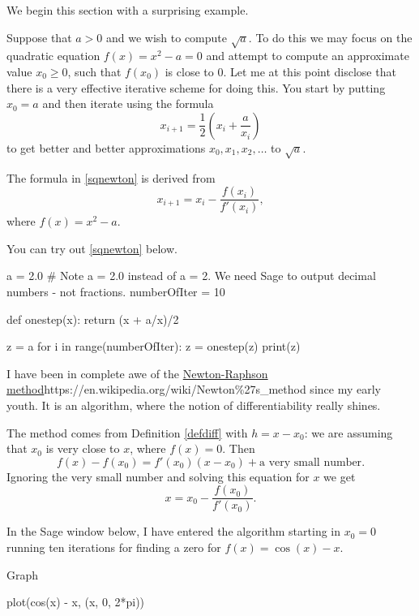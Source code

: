 \documentclass{article}
\begin{document}
We begin this section with a surprising example.



\begin{example}
Suppose that $a> 0$ and we wish to compute $\sqrt{a}$. To do this we may focus on the
quadratic equation $f(x) = x^2 - a = 0$ and attempt to compute an approximate value $x_0\geq 0$,
such that $f(x_0)$ is close to $0$. Let me at this point disclose that there is
a very effective iterative scheme for doing this. You start by putting $x_0 = a$ and then iterate
using the formula
\begin{equation}\label{sqnewton}
x_{i+1} = \frac{1}{2}\left(x_i + \frac{a}{x_i}\right)
\end{equation}
to get better and better approximations $x_0, x_1, x_2, \dots$ to $\sqrt{a}$. 

\begin{openeyes}
The formula in \eqref{sqnewton} is derived from 
$$
x_{i+1} = x_i - \frac{f(x_i)}{f'(x_i)},
$$
where $f(x) = x^2 - a$.
\end{openeyes}


You can try out \eqref{sqnewton}
below.

\begin{sage}
a = 2.0 
# Note a = 2.0 instead of a = 2. We need Sage to output decimal numbers - not fractions.
numberOfIter = 10 

def onestep(x):
  return (x + a/x)/2

z = a
for i in range(numberOfIter):
  z = onestep(z)
  print(z)
\end{sage}
\end{example}

I have been in complete awe of the \url{Newton-Raphson method}{https://en.wikipedia.org/wiki/Newton\%27s_method} since my early youth. It is
an algorithm, where the notion of differentiability really shines.

The method
comes from Definition \ref{defdiff} with $h = x - x_0$:
we are assuming that $x_0$ is very close to $x$, where $f(x) = 0$. Then
$$
f(x) - f(x_0) = f'(x_0) (x- x_0) + \text{a very small number}.
$$
Ignoring the very small number and solving this equation for $x$ we get
$$
x = x_0 - \frac{f(x_0)}{f'(x_0)}.
$$

In the Sage window below, I have entered the algorithm starting
in $x_0 = 0$ running ten iterations for finding a zero for
$f(x) = \cos(x) - x$.

\begin{hideinbutton}{Graph}
  \begin{sage}
    plot(cos(x) - x, (x, 0, 2*pi))
  \end{sage}
\end{hideinbutton}
\end{document}
